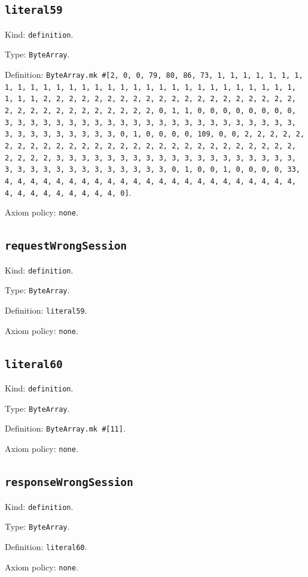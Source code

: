 \documentclass[11pt]{article}
\begin{document}
\subsection*{\texttt{literal59}}
\noindent Kind: \texttt{definition}.\par
\noindent Type: \texttt{ByteArray}.\par
\noindent Definition: \texttt{ByteArray.mk \#[2, 0, 0, 79, 80, 86, 73, 1, 1, 1, 1, 1, 1, 1, 1, 1, 1, 1, 1, 1, 1, 1, 1, 1, 1, 1, 1, 1, 1, 1, 1, 1, 1, 1, 1, 1, 1, 1, 1, 1, 2, 2, 2, 2, 2, 2, 2, 2, 2, 2, 2, 2, 2, 2, 2, 2, 2, 2, 2, 2, 2, 2, 2, 2, 2, 2, 2, 2, 2, 2, 2, 2, 0, 1, 1, 0, 0, 0, 0, 0, 0, 0, 0, 3, 3, 3, 3, 3, 3, 3, 3, 3, 3, 3, 3, 3, 3, 3, 3, 3, 3, 3, 3, 3, 3, 3, 3, 3, 3, 3, 3, 3, 3, 3, 3, 0, 1, 0, 0, 0, 0, 109, 0, 0, 2, 2, 2, 2, 2, 2, 2, 2, 2, 2, 2, 2, 2, 2, 2, 2, 2, 2, 2, 2, 2, 2, 2, 2, 2, 2, 2, 2, 2, 2, 2, 2, 3, 3, 3, 3, 3, 3, 3, 3, 3, 3, 3, 3, 3, 3, 3, 3, 3, 3, 3, 3, 3, 3, 3, 3, 3, 3, 3, 3, 3, 3, 3, 3, 0, 1, 0, 0, 1, 0, 0, 0, 0, 33, 4, 4, 4, 4, 4, 4, 4, 4, 4, 4, 4, 4, 4, 4, 4, 4, 4, 4, 4, 4, 4, 4, 4, 4, 4, 4, 4, 4, 4, 4, 4, 4, 0]}.\par
\noindent Axiom policy: \texttt{none}.\par
\subsection*{\texttt{requestWrongSession}}
\noindent Kind: \texttt{definition}.\par
\noindent Type: \texttt{ByteArray}.\par
\noindent Definition: \texttt{literal59}.\par
\noindent Axiom policy: \texttt{none}.\par
\subsection*{\texttt{literal60}}
\noindent Kind: \texttt{definition}.\par
\noindent Type: \texttt{ByteArray}.\par
\noindent Definition: \texttt{ByteArray.mk \#[11]}.\par
\noindent Axiom policy: \texttt{none}.\par
\subsection*{\texttt{responseWrongSession}}
\noindent Kind: \texttt{definition}.\par
\noindent Type: \texttt{ByteArray}.\par
\noindent Definition: \texttt{literal60}.\par
\noindent Axiom policy: \texttt{none}.\par
\end{document}
